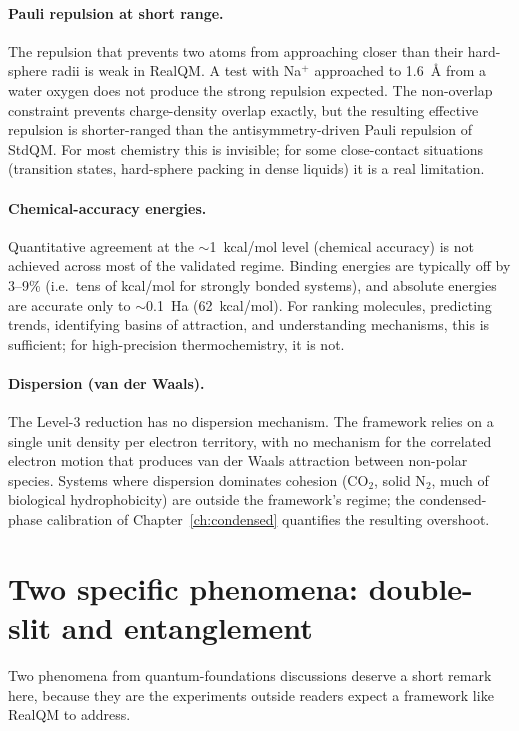 \paragraph{Pauli repulsion at short range.}
The repulsion that prevents two atoms from approaching closer than their hard-sphere radii is weak in RealQM. A test with Na$^+$ approached to 1.6~\AA{} from a water oxygen does not produce the strong repulsion expected. The non-overlap constraint prevents charge-density overlap exactly, but the resulting effective repulsion is shorter-ranged than the antisymmetry-driven Pauli repulsion of StdQM. For most chemistry this is invisible; for some close-contact situations (transition states, hard-sphere packing in dense liquids) it is a real limitation.

\paragraph{Chemical-accuracy energies.}
Quantitative agreement at the $\sim$1~kcal/mol level (chemical accuracy) is not achieved across most of the validated regime. Binding energies are typically off by 3--9\% (i.e.\ tens of kcal/mol for strongly bonded systems), and absolute energies are accurate only to $\sim$0.1~Ha (62~kcal/mol). For ranking molecules, predicting trends, identifying basins of attraction, and understanding mechanisms, this is sufficient; for high-precision thermochemistry, it is not.

\paragraph{Dispersion (van der Waals).}
The Level-3 reduction has no dispersion mechanism. The framework relies on a single unit density per electron territory, with no mechanism for the correlated electron motion that produces van der Waals attraction between non-polar species. Systems where dispersion dominates cohesion (CO$_2$, solid N$_2$, much of biological hydrophobicity) are outside the framework's regime; the condensed-phase calibration of Chapter~\ref{ch:condensed} quantifies the resulting overshoot.

\section{Two specific phenomena: double-slit and entanglement}\label{sec:double-slit-entanglement}

Two phenomena from quantum-foundations discussions deserve a short remark here, because they are the experiments outside readers expect a framework like RealQM to address.


